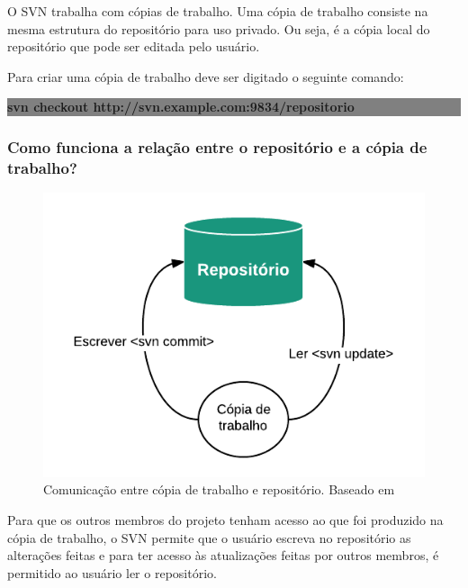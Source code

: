 O SVN trabalha com cópias de trabalho. Uma cópia de trabalho consiste na mesma estrutura do repositório para uso privado. Ou seja, é a cópia local do repositório que pode ser editada pelo usuário.

Para criar uma cópia de trabalho deve ser digitado o seguinte comando: 


\begin{centering}
\colorbox{Gray}{
\begin{minipage}{320px}
  \textbf{svn checkout http://svn.example.com:9834/repositorio}
\end{minipage}
}

\end{centering}

\subsubsection{Como funciona a relação entre o repositório e a cópia de trabalho?}

\begin{figure}[!htb]
\centering
\includegraphics[scale=1]{figuras/repositorio_copia.png}
\caption{Comunicação entre cópia de trabalho e repositório. Baseado em \cite{svn-book}}
\end{figure}


Para que os outros membros do projeto tenham acesso ao que foi produzido na cópia de trabalho, o SVN permite que o usuário escreva no repositório as alterações feitas
e para ter acesso às atualizações feitas por outros membros, é permitido ao usuário ler o repositório. \cite{svn-book}

